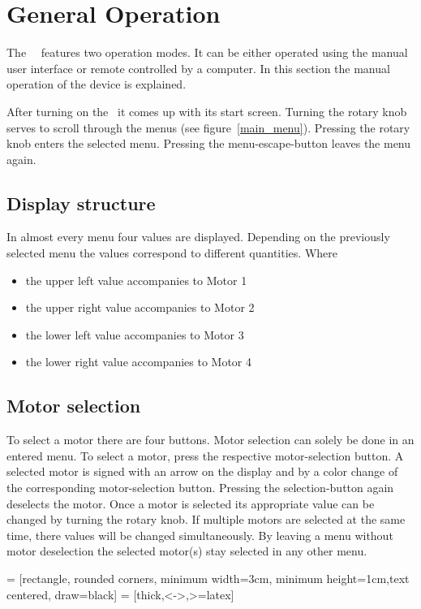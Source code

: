 \section{General Operation}
\label{chp:general_operation}
The \productNumber ~\productName ~features two operation modes. It can be
either operated using the manual user interface or remote controlled by a
computer. In this section the manual operation of the device is explained.

After turning on the \productName ~it comes up with its start screen.
Turning the rotary knob serves to scroll through the menus (see
figure~\ref{main_menu}). Pressing the rotary knob enters the selected
menu. Pressing the menu-escape-button leaves the menu again.

\subsection{Display structure}
In almost every menu four values are displayed. Depending on the previously
selected menu the values correspond to different quantities. Where
\begin{itemize}
  \item the upper left value accompanies to Motor 1
  \item the upper right value accompanies to Motor 2
  \item the lower left value accompanies to Motor 3
  \item the lower right value accompanies to Motor 4
\end{itemize}

\subsection{Motor selection}
To select a motor there are four buttons. Motor selection can solely be done in an entered menu. To select a motor, press the respective motor-selection button. A selected motor is signed with an arrow on the display and by a color change of the corresponding motor-selection button. Pressing the selection-button again deselects the motor. Once a motor is selected its appropriate value can be changed by turning the rotary knob. If multiple motors are selected at the same time, there values will be changed simultaneously. By leaving a menu without motor deselection the selected motor(s) stay selected in any other menu.

 = [rectangle, rounded corners, minimum width=3cm, minimum height=1cm,text centered, draw=black]
 = [thick,<->,>=latex]
\def \textWidth {5cm}

